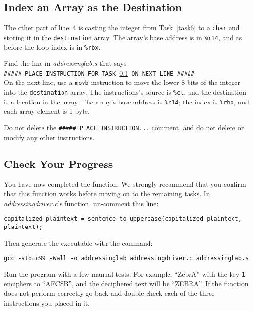 \subsection{Index an Array as the Destination}\label{task7}

The other part of line~4 is casting the integer from Task~\ref{task6} to a
\lstinline{char} and storing it in the \lstinline{destination} array. The
array's base address is in \lstinline{%r14}, and as before the loop index is in
\lstinline{%rbx}.

Find the line in \textit{addressinglab.s} that says \\
\texttt{\#\#\#\#\# PLACE INSTRUCTION FOR TASK \ref{task7} ON NEXT LINE \#\#\#\#\#} \\
On the next line, use a \lstinline{movb} instruction to move the lower 8 bits
of the integer into the \lstinline{destination} array. The instructions's
source is \lstinline{%cl}, and the destination is a location in the array. The
array's base address is \lstinline{%r14}; the index is \lstinline{%rbx}, and
each array element is 1 byte.


Do not delete the \texttt{\#\#\#\#\# PLACE INSTRUCTION...} comment, and do not
delete or modify any other instructions.

\subsection*{Check Your Progress}

You have now completed the  function. We
strongly recommend that you confirm that this function works before moving on
to the remaining tasks. In \textit{addressingdriver.c}'s 
function, un-comment this line:

\begin{lstlisting}
capitalized_plaintext = sentence_to_uppercase(capitalized_plaintext, plaintext);
\end{lstlisting}
Then generate the executable with the command:

\texttt{gcc -std=c99 -Wall -o addressinglab addressingdriver.c addressinglab.s}

Run the program with a few manual tests. For example, ``ZebrA'' with the key
\texttt{1} enciphers to ``AFCSB'', and the deciphered text will be ``ZEBRA''.
If the function does not perform correctly go back and double-check each of the
three instructions you placed in it.


